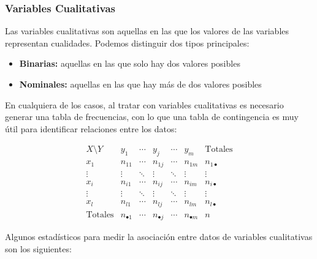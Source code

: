 \subsubsection{Variables Cualitativas}
Las variables cualitativas son aquellas en las que los valores de las variables representan cualidades. Podemos distinguir dos tipos principales:

\begin{itemize}
    \item \textbf{Binarias:} aquellas en las que solo hay dos valores posibles
    \item \textbf{Nominales:} aquellas en las que hay más de dos valores posibles
\end{itemize}

En cualquiera de los casos, al tratar con variables cualitativas es necesario generar una tabla de frecuencias, con lo que una tabla de contingencia es muy útil para identificar relaciones entre los datos:

\[
\begin{array}{c|ccccc|c}
    X \setminus Y & y_1 & \cdots & y_j & \cdots & y_m& \text{Totales} \\
    \hline
    x_1 & n_{11} & \cdots & n_{1j} & \cdots     & n_{1m} & n_{1\bullet}  \\
    \vdots & \vdots & \ddots & \vdots & \ddots  & \vdots & \vdots     \\
    x_i & n_{i1} & \cdots & n_{ij} & \cdots     & n_{im}& n_{i\bullet}  \\
    \vdots & \vdots & \ddots & \vdots & \ddots  & \vdots & \vdots     \\
    x_l & n_{l1} & \cdots & n_{lj} & \cdots     & n_{lm}& n_{l\bullet}  \\
    \hline
    \text{Totales} & n_{\bullet 1} & \cdots & n_{\bullet j} & \cdots & n_{\bullet m} & n
\end{array}
\]

Algunos estadísticos para medir la asociación entre datos de variables cualitativas son los siguientes:


